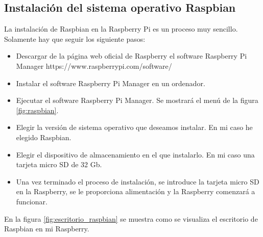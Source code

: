     \subsection{Instalación del sistema operativo Raspbian}
    La instalación de Raspbian en la Raspberry Pi es un proceso muy sencillo. Solamente hay que seguir los siguiente pasos:    
        \begin{itemize}
            \item Descargar de la página web oficial de Raspberry el software Raspberry Pi Manager
            https://www.raspberrypi.com/software/
            \item Instalar el software Raspberry Pi Manager en un ordenador.
            \item Ejecutar el software Raspberry Pi Manager. Se mostrará el menú de la figura \ref{fig:raspbian}.
            \item Elegir la versión de sistema operativo que deseamos instalar. En mi caso he elegido Raspbian.
            \item Elegir el dispositivo de almacenamiento en el que instalarlo. En mi caso una tarjeta micro SD de 32 Gb.
            \item Una vez terminado el proceso de instalación, se introduce la tarjeta micro SD en la Raspberry, se le proporciona alimentación y la Raspberry comenzará a funcionar. 
        \end{itemize}
        En la figura \ref{fig:escritorio_raspbian} se muestra como se visualiza el escritorio de Raspbian en mi Raspberry.

